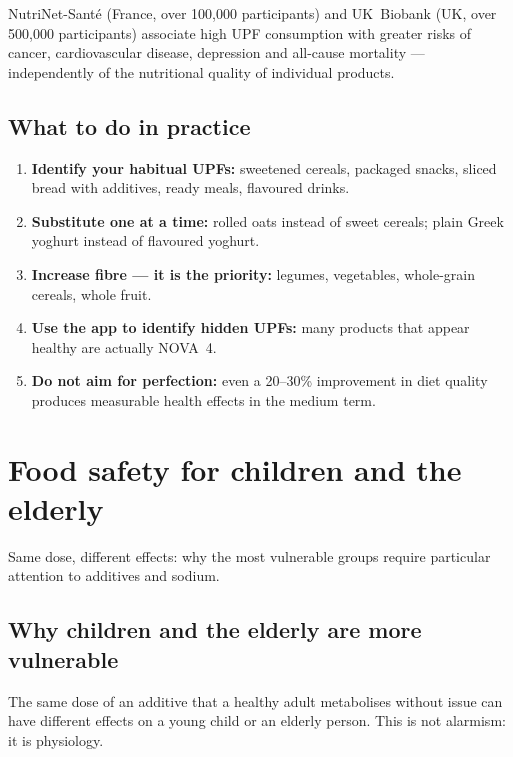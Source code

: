 \documentclass[a5paper,12pt,oneside,openany]{book}
\newcommand{\boxinfo}[2]{%
  \begin{tcolorbox}[boxbase,
    colback=infoBlue!8!white, colframe=infoBlue, title={#1}]
  #2\end{tcolorbox}}
\begin{document}
\boxinfo{Large epidemiological studies confirm this}{NutriNet-Sant\'{e}
(France, over 100,000 participants) and UK~Biobank (UK, over 500,000
participants) associate high UPF consumption with greater risks of cancer,
cardiovascular disease, depression and all-cause mortality ---
independently of the nutritional quality of individual products.}

\section{What to do in practice}

\begin{enumerate}
  \item \textbf{Identify your habitual UPFs:} sweetened cereals, packaged
    snacks, sliced bread with additives, ready meals, flavoured drinks.
  \item \textbf{Substitute one at a time:} rolled oats instead of sweet
    cereals; plain Greek yoghurt instead of flavoured yoghurt.
  \item \textbf{Increase fibre --- it is the priority:} legumes, vegetables,
    whole-grain cereals, whole fruit.
  \item \textbf{Use the app to identify hidden UPFs:} many products that
    appear healthy are actually NOVA~4.
  \item \textbf{Do not aim for perfection:} even a 20--30\% improvement
    in diet quality produces measurable health effects in the medium term.
\end{enumerate}

\chapter{Food safety for children and the elderly}

Same dose, different effects: why the most vulnerable groups require
particular attention to additives and sodium.

\section{Why children and the elderly are more vulnerable}

The same dose of an additive that a healthy adult metabolises without
issue can have different effects on a young child or an elderly person.
This is not alarmism: it is physiology.
\end{document}

